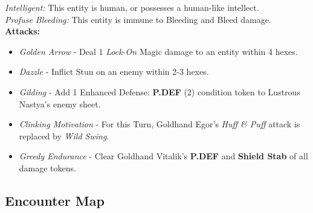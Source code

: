 \emph{Intelligent:} This entity is human, or possesses a human-like intellect.\\

\emph{Profuse Bleeding:} This entity is immune to Bleeding and Bleed damage.\\

\textbf{Attacks:}
\begin{itemize}
\item \emph{Golden Arrow} -  Deal 1 \emph{Lock-On} Magic damage to an entity within 4 hexes.
\item \emph{Dazzle} - Inflict Stun on an enemy within 2-3 hexes.
\item \emph{Gilding} - Add 1 Enhanced Defense: \textbf{P.DEF} (2) condition token to Lustrous Nastya’s enemy sheet.
\item \emph{Clinking Motivation} - For this Turn, Goldhand Egor’s \emph{Huff \& Puff} attack is replaced by \emph{Wild Swing}.
\item \emph{Greedy Endurance} - Clear Goldhand Vitalik’s \textbf{P.DEF} and \textbf{Shield Stab} of all damage tokens. 
\end{itemize}

\pagebreak

\subsection*{Encounter Map}
\begin{center}
\end{center}

